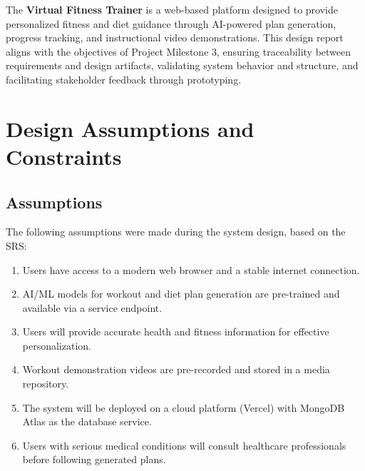 \documentclass[a4paper,12pt]{report}
\begin{document}
The \textbf{Virtual Fitness Trainer} is a web-based platform designed to provide personalized fitness and diet guidance through AI-powered plan generation, progress tracking, and instructional video demonstrations. This design report aligns with the objectives of Project Milestone 3, ensuring traceability between requirements and design artifacts, validating system behavior and structure, and facilitating stakeholder feedback through prototyping.

\section{Design Assumptions and Constraints}

\subsection{Assumptions}
The following assumptions were made during the system design, based on the SRS:
\begin{enumerate}
    \item Users have access to a modern web browser and a stable internet connection.
    \item AI/ML models for workout and diet plan generation are pre-trained and available via a service endpoint.
    \item Users will provide accurate health and fitness information for effective personalization.
    \item Workout demonstration videos are pre-recorded and stored in a media repository.
    \item The system will be deployed on a cloud platform (Vercel) with MongoDB Atlas as the database service.
    \item Users with serious medical conditions will consult healthcare professionals before following generated plans.
\end{enumerate}
\end{document}
